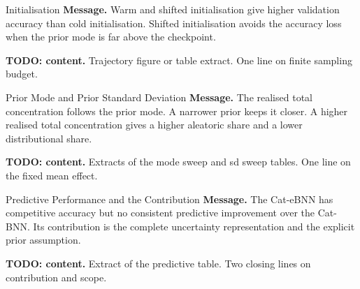 \begin{frame}{Initialisation}
	\textbf{Message.} Warm and shifted initialisation give higher validation accuracy than cold initialisation. Shifted initialisation avoids the accuracy loss when the prior mode is far above the checkpoint.

	\medskip
	\textbf{TODO: content.} Trajectory figure or table extract. One line on finite sampling budget.
\end{frame}

\begin{frame}{Prior Mode and Prior Standard Deviation}
	\textbf{Message.} The realised total concentration follows the prior mode. A narrower prior keeps it closer. A higher realised total concentration gives a higher aleatoric share and a lower distributional share.

	\medskip
	\textbf{TODO: content.} Extracts of the mode sweep and sd sweep tables. One line on the fixed mean effect.
\end{frame}

\begin{frame}{Predictive Performance and the Contribution}
	\textbf{Message.} The Cat-eBNN has competitive accuracy but no consistent predictive improvement over the Cat-BNN. Its contribution is the complete uncertainty representation and the explicit prior assumption.

	\medskip
	\textbf{TODO: content.} Extract of the predictive table. Two closing lines on contribution and scope.
\end{frame}
